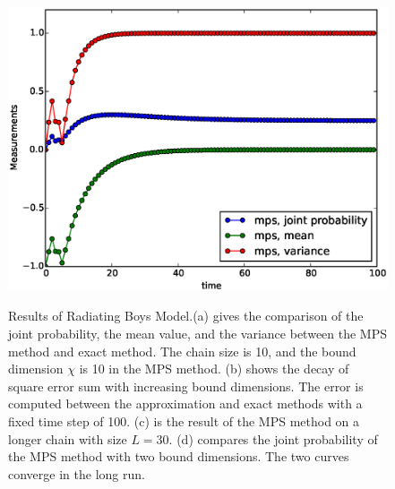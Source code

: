 \documentclass[english]{article}
\begin{document}
\begin{figure}[H]
{\includegraphics[scale=0.4]{Result_Fig/Radiating_MPS_t100_s30_bd10.eps}}\hfill
{}
  \caption{Results of Radiating Boys Model.(a) gives the comparison of the joint probability, the mean value, and the variance between the MPS method and exact method. The chain size is 10, and the bound dimension $\chi$ is 10 in the MPS method. (b) shows the decay of square error sum with increasing bound dimensions. The error is computed between the approximation and exact methods with a fixed time step of 100. (c) is the result of the MPS method on a longer chain with size $L=30$. (d) compares the joint probability of the MPS method with two bound dimensions. The two curves converge in the long run.}
  \label{fig:Radiating_result}
\end{figure}
\end{document}
